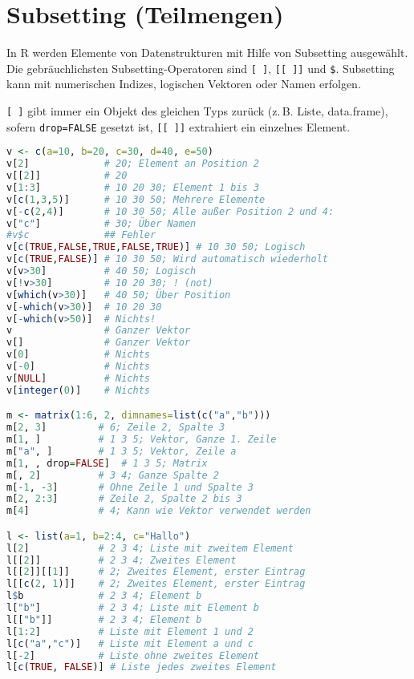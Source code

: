 \documentclass[10pt,twocolumn]{scrartcl}
\begin{document}
\section{Subsetting (Teilmengen)}

In R werden Elemente von Datenstrukturen mit Hilfe von Subsetting ausgewählt. Die gebräuchlichsten Subsetting-Operatoren sind \lstinline|[ ]|, \lstinline|[[ ]]| und \lstinline|$|. Subsetting kann mit numerischen Indizes, logischen Vektoren oder Namen erfolgen.

\lstinline|[ ]| gibt immer ein Objekt des gleichen Typs zurück (z.\,B. Liste, data.frame), sofern \lstinline|drop=FALSE| gesetzt ist, \lstinline|[[ ]]| extrahiert ein einzelnes Element.

\begin{lstlisting}[language=R]
v <- c(a=10, b=20, c=30, d=40, e=50)
v[2]             # 20; Element an Position 2
v[[2]]           # 20
v[1:3]           # 10 20 30; Element 1 bis 3
v[c(1,3,5)]      # 10 30 50; Mehrere Elemente
v[-c(2,4)]       # 10 30 50; Alle außer Position 2 und 4: 
v["c"]           # 30; Über Namen
#v$c             ## Fehler
v[c(TRUE,FALSE,TRUE,FALSE,TRUE)] # 10 30 50; Logisch
v[c(TRUE,FALSE)] # 10 30 50; Wird automatisch wiederholt
v[v>30]          # 40 50; Logisch
v[!v>30]         # 10 20 30; ! (not)
v[which(v>30)]   # 40 50; Über Position
v[-which(v>30)]  # 10 20 30
v[-which(v>50)]  # Nichts!
v                # Ganzer Vektor
v[]              # Ganzer Vektor
v[0]             # Nichts
v[-0]            # Nichts
v[NULL]          # Nichts
v[integer(0)]    # Nichts

m <- matrix(1:6, 2, dimnames=list(c("a","b")))
m[2, 3]         # 6; Zeile 2, Spalte 3
m[1, ]          # 1 3 5; Vektor, Ganze 1. Zeile
m["a", ]        # 1 3 5; Vektor, Zeile a
m[1, , drop=FALSE]  # 1 3 5; Matrix
m[, 2]          # 3 4; Ganze Spalte 2
m[-1, -3]       # Ohne Zeile 1 und Spalte 3
m[2, 2:3]       # Zeile 2, Spalte 2 bis 3
m[4]            # 4; Kann wie Vektor verwendet werden

l <- list(a=1, b=2:4, c="Hallo")
l[2]            # 2 3 4; Liste mit zweitem Element
l[[2]]          # 2 3 4; Zweites Element
l[[2]][[1]]     # 2; Zweites Element, erster Eintrag
l[[c(2, 1)]]    # 2; Zweites Element, erster Eintrag
l$b             # 2 3 4; Element b
l["b"]          # 2 3 4; Liste mit Element b
l[["b"]]        # 2 3 4; Element b
l[1:2]          # Liste mit Element 1 und 2
l[c("a","c")]   # Liste mit Element a und c
l[-2]           # Liste ohne zweites Element
l[c(TRUE, FALSE)] # Liste jedes zweites Element


\end{lstlisting}
\end{document}
